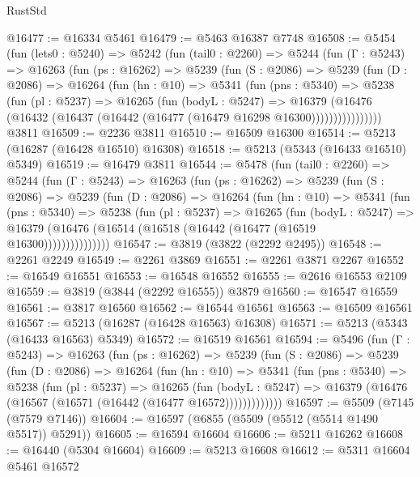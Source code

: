 \begin{lexlean}{RustStd}
\begin{coremodule}
@16477 := @16334 @5461
@16479 := @5463 @16387 @7748
@16508 := @5454
    (fun (lets0 : @5240) =>
    @5242
      (fun (tail0 : @2260) =>
      @5244
        (fun (Γ : @5243) =>
        @16263
          (fun (ps : @16262) =>
          @5239
            (fun (S : @2086) =>
            @5239
              (fun (D : @2086) =>
              @16264
                (fun (hn : @10) =>
                @5341
                  (fun (pns : @5340) =>
                  @5238
                    (fun (pl : @5237) =>
                    @16265
                      (fun (bodyL : @5247) =>
                      @16379
                        (@16476
                          (@16432 (@16437 (@16442 (@16477 (@16479 @16298 @16300))))))))))))))))
    @3811
@16509 := @2236 @3811
@16510 := @16509 @16300
@16514 := @5213 (@16287 (@16428 @16510) @16308)
@16518 := @5213 (@5343 (@16433 @16510) @5349)
@16519 := @16479 @3811
@16544 := @5478
    (fun (tail0 : @2260) =>
    @5244
      (fun (Γ : @5243) =>
      @16263
        (fun (ps : @16262) =>
        @5239
          (fun (S : @2086) =>
          @5239
            (fun (D : @2086) =>
            @16264
              (fun (hn : @10) =>
              @5341
                (fun (pns : @5340) =>
                @5238
                  (fun (pl : @5237) =>
                  @16265
                    (fun (bodyL : @5247) =>
                    @16379 (@16476 (@16514 (@16518 (@16442 (@16477 (@16519 @16300)))))))))))))))
@16547 := @3819 (@3822 (@2292 @2495))
@16548 := @2261 @2249
@16549 := @2261 @3869
@16551 := @2261 @3871 @2267
@16552 := @16549 @16551
@16553 := @16548 @16552
@16555 := @2616 @16553 @2109
@16559 := @3819 (@3844 (@2292 @16555)) @3879
@16560 := @16547 @16559
@16561 := @3817 @16560
@16562 := @16544 @16561
@16563 := @16509 @16561
@16567 := @5213 (@16287 (@16428 @16563) @16308)
@16571 := @5213 (@5343 (@16433 @16563) @5349)
@16572 := @16519 @16561
@16594 := @5496
    (fun (Γ : @5243) =>
    @16263
      (fun (ps : @16262) =>
      @5239
        (fun (S : @2086) =>
        @5239
          (fun (D : @2086) =>
          @16264
            (fun (hn : @10) =>
            @5341
              (fun (pns : @5340) =>
              @5238
                (fun (pl : @5237) =>
                @16265
                  (fun (bodyL : @5247) =>
                  @16379 (@16476 (@16567 (@16571 (@16442 (@16477 @16572)))))))))))))
@16597 := @5509 (@7145 (@7579 @7146))
@16604 := @16597 (@6855 (@5509 (@5512 (@5514 @1490 @5517)) @5291))
@16605 := @16594 @16604
@16606 := @5211 @16262
@16608 := @16440 (@5304 @16604)
@16609 := @5213 @16608
@16612 := @5311 @16604 @5461 @16572

\end{coremodule}
\end{lexlean}
